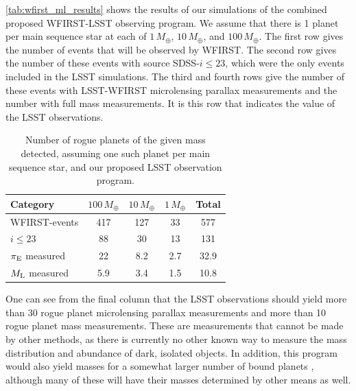 \autoref{tab:wfirst_ml_results}
shows the results of our simulations of the combined proposed WFIRST-LSST
observing program. We assume that there is 1 planet per main sequence
star at each of $1\,M_\oplus$, $10\,M_\oplus$, and $100\,M_\oplus$.
The first row gives the number of events that will be
observed by WFIRST. The second row gives the number of these events
with source SDSS-$i \leq 23$, which were the only events included in the
LSST simulations. The third and fourth rows give the number of these events
with LSST-WFIRST microlensing parallax measurements and the number
with full mass measurements. It is this row that indicates the
value of the LSST observations.

\begin{table}
\begin{tabular}{lcccc}
Category & $100\,M_\oplus$ & $10\,M_\oplus$ & $1\,M_\oplus$ & Total \\
\hline
WFIRST-events    &   417   &         127    &         33    &  577  \\
$i \leq 23$      &    88   &          30    &         13    &  131  \\
$\pi_{\rm E}$ measured &    22   &           8.2  &          2.7  &   32.9 \\
$M_{\rm L}$ measured   &    5.9  &           3.4  &          1.5  &   10.8 \\
\end{tabular}
\caption{Number of rogue planets of the given mass detected, assuming
one such planet per main sequence star, and our proposed LSST observation
program.}
\label{tab:wfirst_ml_results}
\end{table}

One can see from the final column that the LSST observations should
yield more than 30 rogue planet microlensing parallax measurements and
more than 10 rogue planet mass measurements.
%
These are measurements that cannot be made by other methods, as there is
currently no other known way to measure the mass distribution and abundance
of dark, isolated objects.
%
In addition, this program would
also yield masses for a somewhat larger number of bound planets
\citep{2003ApJ...591L..53G}, although many of these will have their
masses determined by other means as well.

